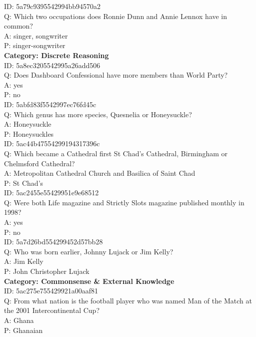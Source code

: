\documentclass[11pt,a4paper]{article}
\begin{document}
\noindent ID: 5a79c9395542994bb94570a2 \\
Q: Which two occupations does Ronnie Dunn and Annie Lennox have in common? \\
A: singer, songwriter \\
P: singer-songwriter \\

\noindent  \textbf{Category: Discrete Reasoning} \\
\noindent ID: 5a8ec3205542995a26add506 \\
Q: Does Dashboard Confessional have more members than World Party? \\
A: yes \\
P: no \\

\noindent ID: 5abfd83f5542997ec76fd45c \\
Q: Which genus has more species, Quesnelia or Honeysuckle? \\
A: Honeysuckle \\
P: Honeysuckles \\

\noindent ID: 5ac44b47554299194317396c \\
Q: Which became a Cathedral first St Chad's Cathedral, Birmingham or Chelmsford Cathedral? \\
A: Metropolitan Cathedral Church and Basilica of Saint Chad \\
P: St Chad's \\

\noindent ID: 5ac2455e55429951e9e68512 \\
Q: Were both Life magazine and Strictly Slots magazine published monthly in 1998? \\
A: yes \\
P: no \\


\noindent ID: 5a7d26bd554299452d57bb28 \\
Q: Who was born earlier, Johnny Lujack or Jim Kelly? \\
A: Jim Kelly \\
P: John Christopher Lujack \\

\noindent \textbf{Category: Commonsense \& External Knowledge} \\
\noindent ID: 5ac275e755429921a00aaf81 \\
\noindent Q: From what nation is the football player who was named Man of the Match at the 2001 Intercontinental Cup? \\
\noindent A: Ghana \\
\noindent P: Ghanaian \\
\end{document}
